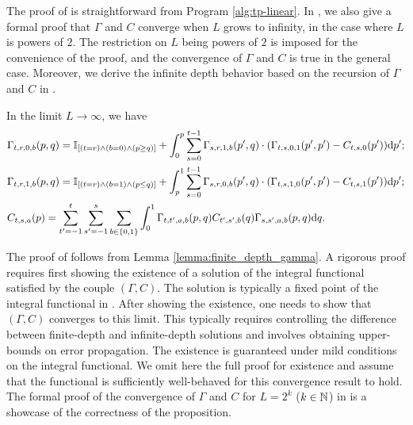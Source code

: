 \documentclass{article}
\theoremstyle{plain}
\theoremstyle{definition}
\begin{document}
The proof of  is straightforward from Program \ref{alg:tp-linear}. 
In , we also give a formal proof that $\Gamma$ and $C$ converge when $L$ grows to infinity, in the case where $L$ is powers of $2$. The restriction on $L$ being powers of $2$ is imposed for the convenience of the proof, and the convergence of $\Gamma$ and $C$ is true in the general case.
Moreover, we derive the infinite depth behavior based on the recursion of $\Gamma$ and $C$ in .

\begin{prop}\label{prop:infinite_depth_linear}
In the limit $L\to \infty$, we  have 
\begin{align*}
  & \Gamma_{t,r,0,b}(p, q)=\mathbb{I}_{[(t=r) \wedge (b=0) \wedge (p\geq q)]} + \int_0^p \sum_{s=0}^{t-1}\Gamma_{s,r,1,b}(p',q)\cdot (\Gamma_{t,s,0,1}(p', p')- C_{t,s,0}(p'))\mathrm{d} p'; \\
     & \Gamma_{t,r,1,b}(p, q) = \mathbb{I}_{[(t=r) \wedge (b=1) \wedge (p\leq q)]} + \int_p^1 \sum_{s=0}^{t-1} \Gamma_{s,r,0,b}(p',q) \cdot (\Gamma_{t,s,1,0}(p',p') - C_{t,s,1}(p'))\mathrm{d} p';\\
     & C_{t,s,a}(p)=\sum_{t'=-1}^{t}\sum_{s'=-1}^{s}\sum_{b\in\{0,1\}}\int_0^1 \Gamma_{t,t',a,b}(p,q) C_{t',s',b}(q)\Gamma_{s,s',a,b}(p,q) \mathrm{d} q.
\end{align*}
\end{prop}

The proof of  follows from Lemma \ref{lemma:finite_depth_gamma}. A rigorous proof requires first showing the existence of a solution of the integral functional satisfied by the couple $(\Gamma, C)$. The solution is typically a fixed point of the integral functional in . After showing the existence, one needs to show that $(\Gamma, C)$ converges to this limit. This typically requires controlling the difference between finite-depth and infinite-depth solutions and involves obtaining upper-bounds on error propagation. The existence is guaranteed under mild conditions on the integral functional. We omit here the full proof for existence and assume that the functional is sufficiently well-behaved for this convergence result to hold. The formal proof of the convergence of $\Gamma$ and $C$ for $L=2^k$ ($k\in \mathbb{N}$) in  is a showcase of the correctness of the proposition.
\end{document}
